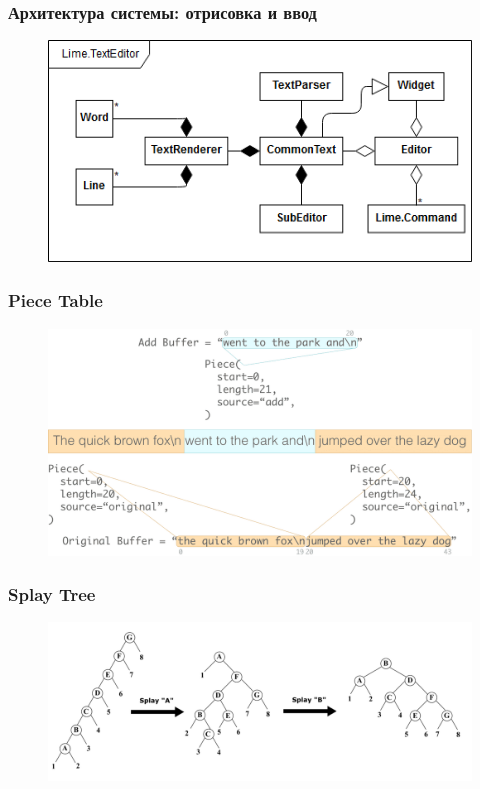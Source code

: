 \documentclass[10pt, unicode]{beamer}
\begin{document}
    \begin{frame}
        \frametitle{Архитектура системы: отрисовка и ввод}
        \begin{figure}
            \centering
            \includegraphics[width=\textwidth]{diagrams/EditorScheme.png}
        \end{figure}
    \end{frame}
    \begin{frame}
        \frametitle{Piece Table}
        \begin{figure}
            \centering
            \includegraphics[width=\textwidth]{images/PieceTableExample.png}
        \end{figure}
    \end{frame}
    \begin{frame}
        \frametitle{Splay Tree}
        \begin{figure}
            \centering
            \includegraphics[width=\textwidth]{images/SplayTreeExample.png}
        \end{figure}
    \end{frame}
\end{document}
